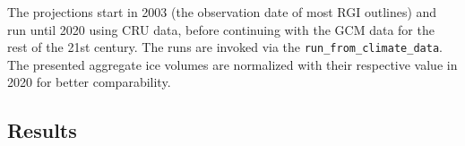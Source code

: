      The projections start in 2003 (the  observation date of most RGI outlines) and run until 2020 using CRU data, before continuing with the GCM data for the rest of the 21st century. The runs are invoked via the \lstinline`run_from_climate_data`. The presented aggregate ice volumes are normalized with their respective value in 2020 for better comparability.
    

    \subsection{Results} %
    \label{sub:results_projection}


